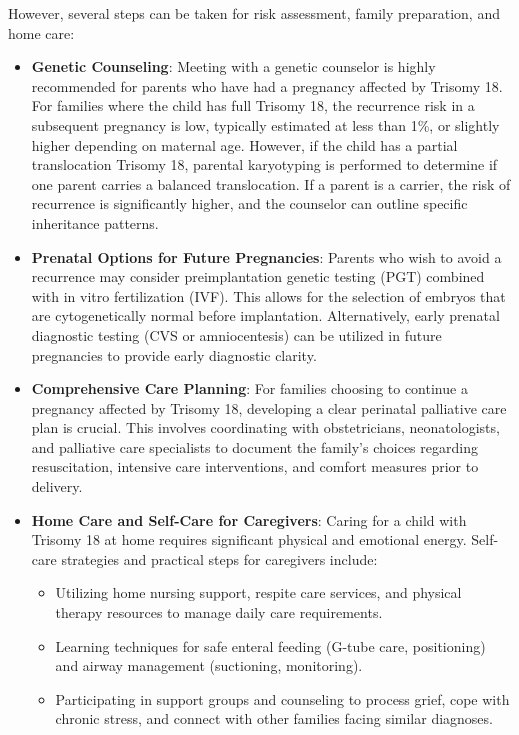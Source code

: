 However, several steps can be taken for risk assessment, family preparation, and home care:
\begin{itemize}
    \item \textbf{Genetic Counseling}: Meeting with a genetic counselor is highly recommended for parents who have had a pregnancy affected by Trisomy 18. For families where the child has full Trisomy 18, the recurrence risk in a subsequent pregnancy is low, typically estimated at less than 1\%, or slightly higher depending on maternal age. However, if the child has a partial translocation Trisomy 18, parental karyotyping is performed to determine if one parent carries a balanced translocation. If a parent is a carrier, the risk of recurrence is significantly higher, and the counselor can outline specific inheritance patterns.
    \item \textbf{Prenatal Options for Future Pregnancies}: Parents who wish to avoid a recurrence may consider preimplantation genetic testing (PGT) combined with in vitro fertilization (IVF). This allows for the selection of embryos that are cytogenetically normal before implantation. Alternatively, early prenatal diagnostic testing (CVS or amniocentesis) can be utilized in future pregnancies to provide early diagnostic clarity.
    \item \textbf{Comprehensive Care Planning}: For families choosing to continue a pregnancy affected by Trisomy 18, developing a clear perinatal palliative care plan is crucial. This involves coordinating with obstetricians, neonatologists, and palliative care specialists to document the family's choices regarding resuscitation, intensive care interventions, and comfort measures prior to delivery.
    \item \textbf{Home Care and Self-Care for Caregivers}: Caring for a child with Trisomy 18 at home requires significant physical and emotional energy. Self-care strategies and practical steps for caregivers include:
    \begin{itemize}
        \item Utilizing home nursing support, respite care services, and physical therapy resources to manage daily care requirements.
        \item Learning techniques for safe enteral feeding (G-tube care, positioning) and airway management (suctioning, monitoring).
        \item Participating in support groups and counseling to process grief, cope with chronic stress, and connect with other families facing similar diagnoses.
    \end{itemize}
\end{itemize}

